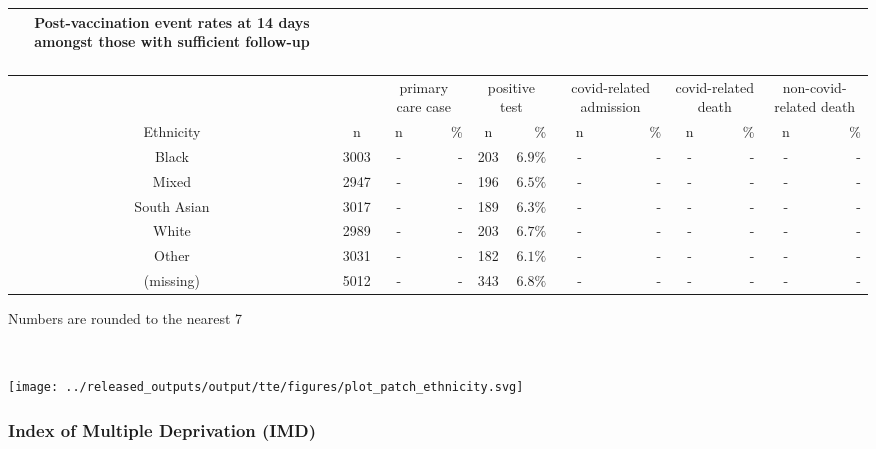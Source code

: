 \documentclass[
]{article}
\begin{document}
\captionsetup[table]{labelformat=empty,skip=1pt}
\begin{longtable}{cccrcrcrcrcr}
\caption*{
\large Post-vaccination event rates at 14 days amongst those with sufficient follow-up\\ 
\small \\ 
} \\ 
\toprule
& & \multicolumn{2}{c}{primary care case} & \multicolumn{2}{c}{positive test} & \multicolumn{2}{c}{covid-related admission} & \multicolumn{2}{c}{covid-related death} & \multicolumn{2}{c}{non-covid-related death} \\ 
 \cmidrule(lr){3-4}\cmidrule(lr){5-6}\cmidrule(lr){7-8}\cmidrule(lr){9-10}\cmidrule(lr){11-12}
Ethnicity & n & n & \% & n & \% & n & \% & n & \% & n & \% \\ 
\midrule
Black & 3003 & - & - & 203 & $6.9\%$ & - & - & - & - & - & - \\ 
Mixed & 2947 & - & - & 196 & $6.5\%$ & - & - & - & - & - & - \\ 
South Asian & 3017 & - & - & 189 & $6.3\%$ & - & - & - & - & - & - \\ 
White & 2989 & - & - & 203 & $6.7\%$ & - & - & - & - & - & - \\ 
Other & 3031 & - & - & 182 & $6.1\%$ & - & - & - & - & - & - \\ 
(missing) & 5012 & - & - & 343 & $6.8\%$ & - & - & - & - & - & - \\ 
\bottomrule
\end{longtable}
\begin{minipage}{\linewidth}
Numbers are rounded to the nearest 7\\ 
\end{minipage}

~ ~

\texttt{[image: ../released\_outputs/output/tte/figures/plot\_patch\_ethnicity.svg]}

\hypertarget{index-of-multiple-deprivation-imd}{%
\subsubsection{Index of Multiple Deprivation
(IMD)}\label{index-of-multiple-deprivation-imd}}
\end{document}
